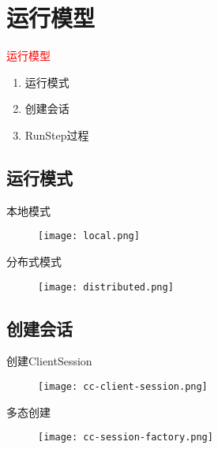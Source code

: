 \section{运行模型}
\label{sec:exec-model}

\begin{frame}
  \begin{center}
    \Huge{\textcolor{red}{运行模型}}
  \end{center}

  \begin{enumerate}
    \item \alert{运行模式}
    \item \alert{创建会话}
    \item \alert{RunStep过程}
  \end{enumerate}
\end{frame}

\subsection{运行模式}

\begin{frame}{本地模式}
  \begin{figure}
    \centering
    \texttt{[image: local.png]}
  \end{figure}
\end{frame}

\begin{frame}{分布式模式}
  \begin{figure}
    \centering
    \texttt{[image: distributed.png]}
  \end{figure}
\end{frame}

\subsection{创建会话}

\begin{frame}{创建ClientSession}
  \begin{figure}
    \centering
    \texttt{[image: cc-client-session.png]}
  \end{figure}
\end{frame}

\begin{frame}{多态创建}
  \begin{figure}
    \centering
    \texttt{[image: cc-session-factory.png]}
  \end{figure}
\end{frame}

